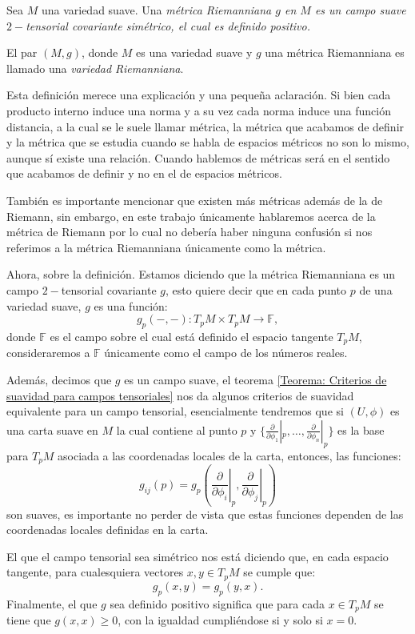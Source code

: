 \begin{definition}
	Sea $M$ una variedad suave. Una \it{métrica Riemanniana} $g$ en $M$ es un campo suave $2-$tensorial covariante simétrico, el cual es definido positivo.

	El par $(M,g)$, donde $M$ es una variedad suave y $g$ una métrica Riemanniana es llamado una \textit{variedad Riemanniana}.
\end{definition}

Esta definición merece una explicación y una pequeña aclaración. Si bien cada producto interno induce una norma y a su vez cada norma induce una función distancia, a la cual se le suele llamar métrica, la métrica que acabamos de definir y la métrica que se estudia cuando se habla de espacios métricos no son lo mismo, aunque sí existe una relación. Cuando hablemos de métricas será en el sentido que acabamos de definir y no en el de espacios métricos.

También es importante mencionar que existen más métricas además de la de Riemann, sin embargo, en este trabajo únicamente hablaremos acerca de la métrica de Riemann por lo cual no debería haber ninguna confusión si nos referimos a la métrica Riemanniana únicamente como la métrica.

Ahora, sobre la definición. Estamos diciendo que la métrica Riemanniana es un campo $2-$tensorial covariante $g$, esto quiere decir que en cada punto $p$ de una variedad suave, $g$ es una función:
\[
	g_{p}(-,-): T_{p}M \times T_{p}M \to \mathbb{F},
\]
donde $\mathbb{F}$ es el campo sobre el cual está definido el espacio tangente $T_{p}M$, consideraremos a $\mathbb{F}$ únicamente como el campo de los números reales.

Además, decimos que $g$ es un campo suave, el teorema \ref{Teorema: Criterios de suavidad para campos tensoriales} nos da algunos criterios de suavidad equivalente para un campo tensorial, esencialmente tendremos que si $(U,\phi)$ es una carta suave en $M$ la cual contiene al punto $p$ y $\{
	\frac{\partial}{\partial \phi_{1}} |_{p}, \ldots,
	\frac{\partial}{\partial \phi_{n}} |_{p}
	\}$ es la base para $T_{p}M$ asociada a las coordenadas locales de la carta, entonces, las funciones:
\[
	g_{ij}(p) = g_{p}\left(
	\left. \frac{\partial}{\partial \phi_{i}}\right|_{p},
	\left. \frac{\partial}{\partial \phi_{j}}\right|_{p}
	\right)
\]
son suaves, es importante no perder de vista que estas funciones dependen de las coordenadas locales definidas en la carta.

El que el campo tensorial sea simétrico nos está diciendo que, en cada espacio tangente, para cualesquiera vectores $x, y \in T_{p}M$ se cumple que:
\[
	g_{p}(x,y) = g_{p}(y,x).
\]
Finalmente, el que $g$ sea definido positivo significa que para cada $x \in T_{p}M$ se tiene que $g(x,x) \geq 0$, con la igualdad cumpliéndose si y solo si $x = 0$.

